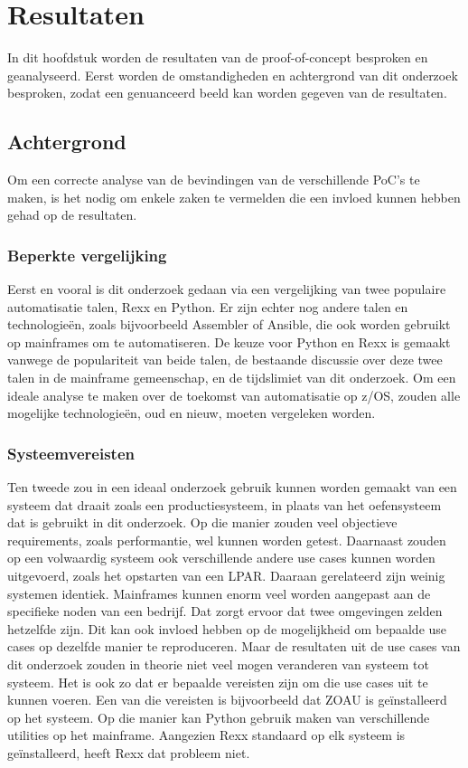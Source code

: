 \chapter{Resultaten}%
\label{ch:Resultaten}
In dit hoofdstuk worden de resultaten van de proof-of-concept besproken en geanalyseerd. Eerst worden de omstandigheden en achtergrond van dit onderzoek besproken, zodat een genuanceerd beeld kan worden gegeven van de resultaten.

\section{Achtergrond}
Om een correcte analyse van de bevindingen van de verschillende PoC's te maken, is het nodig om enkele zaken te vermelden die een invloed kunnen hebben gehad op de resultaten.

\subsection{Beperkte vergelijking}
Eerst en vooral is dit onderzoek gedaan via een vergelijking van twee populaire automatisatie talen, Rexx en Python. Er zijn echter nog andere talen en technologieën, zoals bijvoorbeeld Assembler of Ansible, die ook worden gebruikt op mainframes om te automatiseren. De keuze voor Python en Rexx is gemaakt vanwege de populariteit van beide talen, de bestaande discussie over deze twee talen in de mainframe gemeenschap, en de tijdslimiet van dit onderzoek. Om een ideale analyse te maken over de toekomst van automatisatie op z/OS, zouden alle mogelijke technologieën, oud en nieuw, moeten vergeleken worden.

\subsection{Systeemvereisten}
Ten tweede zou in een ideaal onderzoek gebruik kunnen worden gemaakt van een systeem dat draait zoals een productiesysteem, in plaats van het oefensysteem dat is gebruikt in dit onderzoek. Op die manier zouden veel objectieve requirements, zoals performantie, wel kunnen worden getest. Daarnaast zouden op een volwaardig systeem ook verschillende andere use cases kunnen worden uitgevoerd, zoals het opstarten van een LPAR. Daaraan gerelateerd zijn weinig systemen identiek. Mainframes kunnen enorm veel worden aangepast aan de specifieke noden van een bedrijf. Dat zorgt ervoor dat twee omgevingen zelden hetzelfde zijn. Dit kan ook invloed hebben op de mogelijkheid om bepaalde use cases op dezelfde manier te reproduceren. Maar de resultaten uit de use cases van dit onderzoek zouden in theorie niet veel mogen veranderen van systeem tot systeem. Het is ook zo dat er bepaalde vereisten zijn om die use cases uit te kunnen voeren. Een van die vereisten is bijvoorbeeld dat ZOAU is geïnstalleerd op het systeem. Op die manier kan Python gebruik maken van verschillende utilities op het mainframe. Aangezien Rexx standaard op elk systeem is geïnstalleerd, heeft Rexx dat probleem niet.

